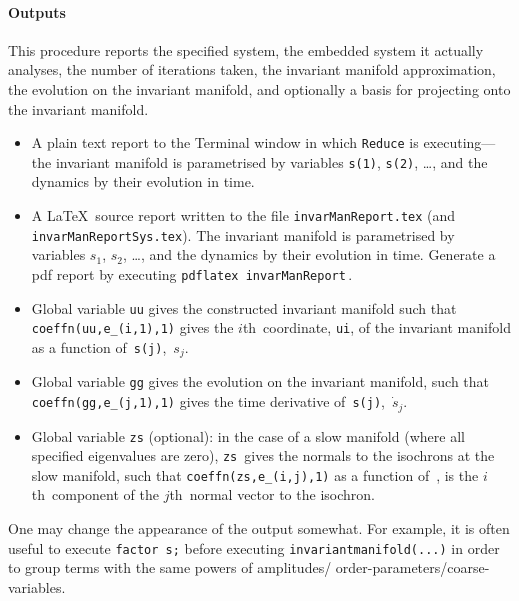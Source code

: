 \documentclass[11pt,a5paper]{article}
\begin{document}
\paragraph{Outputs}  This procedure reports the specified
system, the embedded system it actually analyses, the number
of iterations taken, the invariant manifold approximation,
the evolution on the invariant manifold, and optionally a
basis for projecting onto the invariant manifold.
\begin{itemize}
\item A plain text report to the Terminal window in which
\verb|Reduce| is executing---the invariant manifold is
parametrised by variables \verb|s(1)|, \verb|s(2)|, \ldots,
and the dynamics by their evolution in time.

\item A \LaTeX\ source report written to the file
\verb|invarManReport.tex| (and
\verb|invarManReportSys.tex|). The invariant manifold is
parametrised by variables \(s_1\), \(s_2\), \ldots, and the
dynamics by their evolution in time.  Generate a pdf report
by executing \verb|pdflatex invarManReport|\,.

\item Global variable \verb|uu| gives the constructed 
invariant manifold such that \verb|coeffn(uu,e_(i,1),1)| 
gives the \(i\)th~coordinate, \verb|ui|, of the invariant 
manifold as a function of~\verb|s(j)|,~\(s_j\).

\item Global variable \verb|gg| gives the evolution on the 
invariant manifold, such that \verb|coeffn(gg,e_(j,1),1)| 
gives the time derivative of~\verb|s(j)|,~\(\dot s_j\).

\item Global variable \verb|zs| (optional): in the case of 
a slow manifold (where all specified eigenvalues are zero), 
\verb|zs|~gives the normals to the isochrons at the slow 
manifold, such that \verb|coeffn(zs,e_(i,j),1)| as a 
function of~\sv, is the \(i\)th~component of the 
\(j\)th~normal vector to the isochron.

\end{itemize}
One may change the appearance of the output somewhat. For
example, it is often useful to execute  \verb|factor s;|
before executing \verb|invariantmanifold(...)| in order to
group terms with the same powers of amplitudes\slash
order-parameters\slash coarse-variables.
\end{document}
